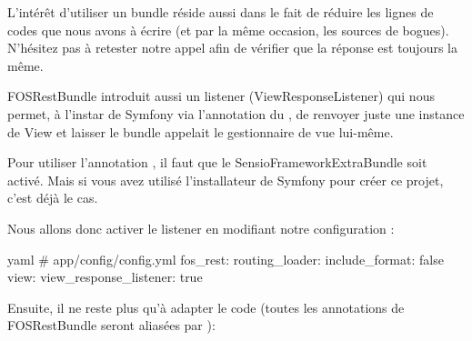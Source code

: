 \documentclass[big]{zmdocument}
\begin{document}
L'intérêt d'utiliser un bundle réside aussi dans le fait de réduire les lignes de codes que nous avons à écrire (et par la même occasion, les sources de bogues). N'hésitez pas à retester notre appel afin de vérifier que la réponse est toujours la même.



FOSRestBundle introduit aussi un listener (ViewResponseListener) qui nous permet, à l'instar de Symfony via l'annotation  du , de renvoyer juste une instance de View et laisser le bundle appelait le gestionnaire de vue lui-même.



\begin{Error}
Pour utiliser l'annotation , il faut que le SensioFrameworkExtraBundle soit activé. Mais si vous avez utilisé l'installateur de Symfony pour créer ce projet, c'est déjà le cas.
\end{Error}


Nous allons donc activer le listener en modifiant notre configuration :



\begin{CodeBlock}{yaml}
# app/config/config.yml
fos_rest:
    routing_loader:
        include_format: false
    view:
        view_response_listener: true
\end{CodeBlock}



Ensuite, il ne reste plus qu'à adapter le code (toutes les annotations de FOSRestBundle seront aliasées par ):
\end{document}

